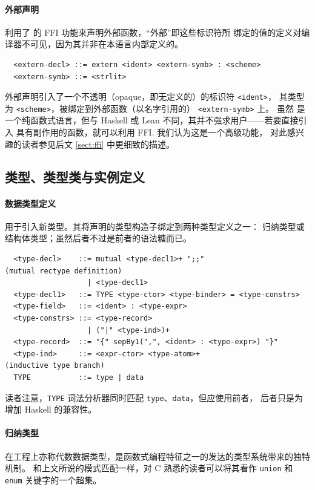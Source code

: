 \documentclass[a4paper, 11pt]{article}
\theoremstyle{remark}\newtheorem*{remark}{Remark}
\theoremstyle{definition}\newtheorem*{definition}{Definition}
\begin{document}
\paragraph{外部声明} 利用了 \Tigris 的 FFI 功能来声明外部函数，“外部”即这些标识符所
绑定的值的定义对编译器不可见，因为其并非在本语言内部定义的。
\begin{verbatim}
  <extern-decl> ::= extern <ident> <extern-symb> : <scheme>
  <extern-symb> ::= <strlit>
\end{verbatim}

外部声明引入了一个不透明（opaque，即无定义的）的标识符 \texttt{<ident>}，
其类型为 \texttt{<scheme>}，被绑定到外部函数（以名字引用的） \texttt{<extern-symb>} 上。
虽然 \Tigris 是一个纯函数式语言，但与 Haskell 或 Lean 不同，其并不强求用户——若要直接引入
具有副作用的函数，就可以利用 FFI. 我们认为这是一个高级功能，
对此感兴趣的读者参见后文 \autoref{sect:ffi} 中更细致的描述。

\subsection{类型、类型类与实例定义}
\paragraph{数据类型定义} 用于引入新类型。其将声明的类型构造子绑定到两种类型定义之一：
归纳类型或结构体类型；虽然后者不过是前者的语法糖而已。

\begin{verbatim}
  <type-decl>    ::= mutual <type-decl1>+ ";;"                     (mutual rectype definition)
                   | <type-decl1>
  <type-decl1>   ::= TYPE <type-ctor> <type-binder> = <type-constrs>
  <type-field>   ::= <ident> : <type-expr>
  <type-constrs> ::= <type-record>
                   | ("|" <type-ind>)+
  <type-record>  ::= "{" sepBy1(",", <ident> : <type-expr>) "}"
  <type-ind>     ::= <expr-ctor> <type-atom>+                      (inductive type branch)
  TYPE           ::= type | data
\end{verbatim}
读者注意，\texttt{TYPE} 词法分析器同时匹配 \texttt{type}、\texttt{data}，但应使用前者，
后者只是为增加 Haskell 的兼容性。

\paragraph{归纳类型} 在工程上亦称代数数据类型，是函数式编程特征之一的发达的类型系统带来的独特机制。
和上文所说的模式匹配一样，对 C 熟悉的读者可以将其看作 \texttt{union} 和 \texttt{enum} 关键字的一个超集。
\end{document}
